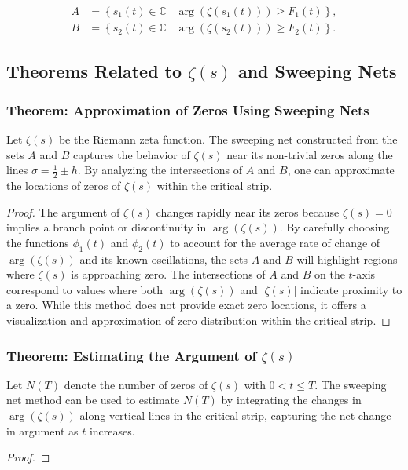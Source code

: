 \documentclass{article}
\begin{document}
\begin{align}
A &= \left\{ s_1(t) \in \mathbb{C} \mid \arg\left( \zeta\left( s_1(t) \right) \right) \geq F_1(t) \right\}, \label{eq:A_def_zeta}\\
B &= \left\{ s_2(t) \in \mathbb{C} \mid \arg\left( \zeta\left( s_2(t) \right) \right) \geq F_2(t) \right\}. \label{eq:B_def_zeta}
\end{align} \subsection{Theorems Related to $\zeta(s)$ and Sweeping Nets} \subsubsection{Theorem: Approximation of Zeros Using Sweeping Nets} \begin{theorem}
Let $\zeta(s)$ be the Riemann zeta function. The sweeping net constructed from the sets $A$ and $B$ captures the behavior of $\zeta(s)$ near its non-trivial zeros along the lines $\sigma = \tfrac{1}{2} \pm h$. By analyzing the intersections of $A$ and $B$, one can approximate the locations of zeros of $\zeta(s)$ within the critical strip.
\end{theorem} \begin{proof}
The argument of $\zeta(s)$ changes rapidly near its zeros because $\zeta(s) = 0$ implies a branch point or discontinuity in $\arg(\zeta(s))$. By carefully choosing the functions $\phi_1(t)$ and $\phi_2(t)$ to account for the average rate of change of $\arg(\zeta(s))$ and its known oscillations, the sets $A$ and $B$ will highlight regions where $\zeta(s)$ is approaching zero. The intersections of $A$ and $B$ on the $t$-axis correspond to values where both $\arg(\zeta(s))$ and $|\zeta(s)|$ indicate proximity to a zero. While this method does not provide exact zero locations, it offers a visualization and approximation of zero distribution within the critical strip.
\end{proof} \subsubsection{Theorem: Estimating the Argument of $\zeta(s)$} \begin{theorem}
Let $N(T)$ denote the number of zeros of $\zeta(s)$ with $0 < t \leq T$. The sweeping net method can be used to estimate $N(T)$ by integrating the changes in $\arg(\zeta(s))$ along vertical lines in the critical strip, capturing the net change in argument as $t$ increases.
\end{theorem} \begin{proof}

\end{proof}
\end{document}
